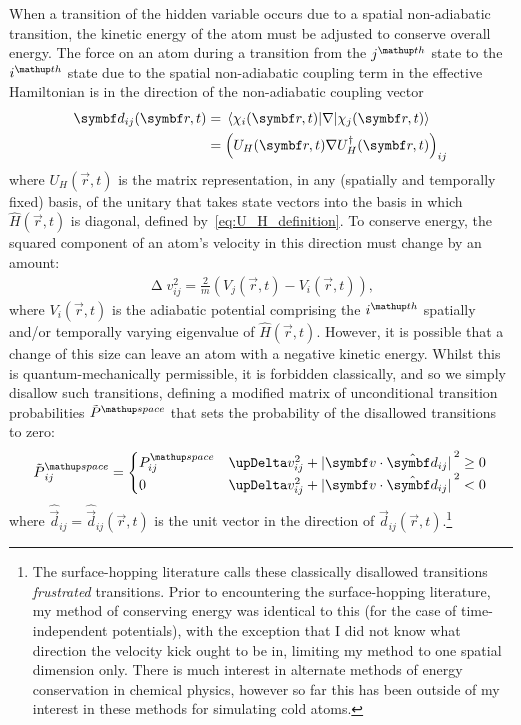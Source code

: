 When a transition of the hidden variable occurs due to a spatial non-adiabatic transition, the kinetic energy of the atom must be adjusted to conserve overall energy. The force on an atom during a transition from the $j^\up{th}$ state to the $i^\up{th}$ state due to the spatial non-adiabatic coupling term in the effective Hamiltonian is in the direction of the non-adiabatic coupling vector~\cite{doi:10.1146/annurev-physchem-040215-112245}
\begin{align}\label{eq:non_adiabatic_coupling_vector}
\vec d_{ij}(\vec r, t) &= \matrixel{\chi_i(\vec r, t)}{\nabla}{\chi_j(\vec r, t)}\\
&= \left(U_H(\vec r, t)\nabla U_H^\dagger(\vec r, t)\right)_{ij}
\end{align}
where $U_H(\vec r, t)$ is the matrix representation, in any (spatially and temporally fixed) basis, of the unitary that takes state vectors into the basis in which $\hat H(\vec r, t)$ is diagonal, defined by~\eqref{eq:U_H_definition}. To conserve energy, the squared component of an atom's velocity in this direction must change by an amount:
\begin{align}\label{eq:delta_v_squared}
\upDelta v_{ij}^2 = \frac2m\left(V_j(\vec r, t) - V_i(\vec r, t)\right),
\end{align}
where $V_i(\vec r, t)$ is the adiabatic potential comprising the $i^\up{th}$ spatially and/or temporally varying eigenvalue of $\hat H(\vec r, t)$. However, it is possible that a change of this size can leave an atom with a negative kinetic energy. Whilst this is quantum-mechanically permissible, it is forbidden classically, and so we simply disallow such transitions, defining a modified matrix of unconditional transition probabilities $\tilde P^\up{space}$ that sets the probability of the disallowed transitions to zero:
\begin{align}\label{eq:tilde_P_space}
\tilde P^\up{space}_{ij} =
\begin{cases}
P^\up{space}_{ij} & \upDelta v_{ij}^2 + \abs{\vec v\cdot\hat{\vec d}_{ij}}^2 \geq 0 \\
0 & \upDelta v_{ij}^2 + \abs{\vec v\cdot\hat{\vec d}_{ij}}^2 < 0
\end{cases}
\end{align}
where $\hat{\vec d}_{ij} = \hat{\vec d}_{ij}(\vec r, t)$ is the unit vector in the direction of $\vec d_{ij}(\vec r, t)$.\footnote{The surface-hopping literature calls these classically disallowed transitions \emph{frustrated} transitions. Prior to encountering the surface-hopping literature, my method of conserving energy was identical to this (for the case of time-independent potentials), with the exception that I did not know what direction the velocity kick ought to be in, limiting my method to one spatial dimension only. There is much interest in alternate methods of energy conservation in chemical physics, however so far this has been outside of my interest in these methods for simulating cold atoms.}

